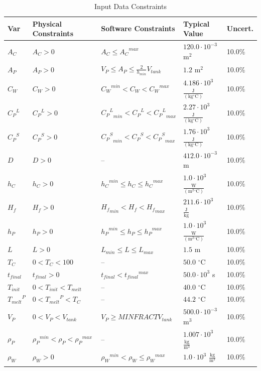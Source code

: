 \documentclass[12pt]{article}
\begin{document}
\begin{longtable}{l l l l l}
\toprule
Var & Physical Constraints & Software Constraints & Typical Value & Uncert.
\\
\midrule
${A_{C}}$ & ${A_{C}}>0$ & ${A_{C}}\leq{}{{A_{C}}^{max}}$ & $120.0\cdot{}10^{-3}$ $\text{m}^{2}$ & 10.0\%
\\
${A_{P}}$ & ${A_{P}}>0$ & ${V_{P}}\leq{}{A_{P}}\leq{}\frac{2}{{h_{min}}} {V_{tank}}$ & $1.2$ $\text{m}^{2}$ & 10.0\%
\\
${C_{W}}$ & ${C_{W}}>0$ & ${{C_{W}}^{min}}<{C_{W}}<{{C_{W}}^{max}}$ & $4.186\cdot{}10^{3}$ $\frac{\text{J}}{(\text{kg}{}^{\circ}\text{C})}$ & 10.0\%
\\
${{C_{P}}^{L}}$ & ${{C_{P}}^{L}}>0$ & ${{{C_{P}}^{L}}_{min}}<{{C_{P}}^{L}}<{{{C_{P}}^{L}}_{max}}$ & $2.27\cdot{}10^{3}$ $\frac{\text{J}}{(\text{kg}{}^{\circ}\text{C})}$ & 10.0\%
\\
${{C_{P}}^{S}}$ & ${{C_{P}}^{S}}>0$ & ${{{C_{P}}^{S}}_{min}}<{{C_{P}}^{S}}<{{{C_{P}}^{S}}_{max}}$ & $1.76\cdot{}10^{3}$ $\frac{\text{J}}{(\text{kg}{}^{\circ}\text{C})}$ & 10.0\%
\\
$D$ & $D>0$ & -- & $412.0\cdot{}10^{-3}$ m & 10.0\%
\\
${h_{C}}$ & ${h_{C}}>0$ & ${{h_{C}}^{min}}\leq{}{h_{C}}\leq{}{{h_{C}}^{max}}$ & $1.0\cdot{}10^{3}$ $\frac{\text{W}}{(\text{m}^{2}{}^{\circ}\text{C})}$ & 10.0\%
\\
${H_{f}}$ & ${H_{f}}>0$ & ${{H_{f}}_{min}}<{H_{f}}<{{H_{f}}_{max}}$ & $211.6\cdot{}10^{3}$ $\frac{\text{J}}{\text{kg}}$ & 10.0\%
\\
${h_{P}}$ & ${h_{P}}>0$ & ${{h_{P}}^{min}}\leq{}{h_{P}}\leq{}{{h_{P}}^{max}}$ & $1.0\cdot{}10^{3}$ $\frac{\text{W}}{(\text{m}^{2}{}^{\circ}\text{C})}$ & 10.0\%
\\
$L$ & $L>0$ & ${L_{min}}\leq{}L\leq{}{L_{max}}$ & $1.5$ m & 10.0\%
\\
${T_{C}}$ & $0<{T_{C}}<100$ & -- & $50.0$ ${}^{\circ}$C & 10.0\%
\\
${t_{final}}$ & ${t_{final}}>0$ & ${t_{final}}<{{t_{final}}^{max}}$ & $50.0\cdot{}10^{3}$ s & 10.0\%
\\
${T_{init}}$ & $0<{T_{init}}<{T_{melt}}$ & -- & $40.0$ ${}^{\circ}$C & 10.0\%
\\
${{T_{melt}}^{P}}$ & $0<{{T_{melt}}^{P}}<{T_{C}}$ & -- & $44.2$ ${}^{\circ}$C & 10.0\%
\\
${V_{P}}$ & $0<{V_{P}}<{V_{tank}}$ & ${V_{P}}\geq{}MINFRACT {V_{tank}}$ & $500.0\cdot{}10^{-3}$ $\text{m}^{3}$ & 10.0\%
\\
${ρ_{P}}$ & ${{ρ_{P}}^{min}}<{ρ_{P}}<{{ρ_{P}}^{max}}$ & -- & $1.007\cdot{}10^{3}$ $\frac{\text{kg}}{\text{m}^{3}}$ & 10.0\%
\\
${ρ_{W}}$ & ${ρ_{W}}>0$ & ${{ρ_{W}}^{min}}<{ρ_{W}}\leq{}{{ρ_{W}}^{max}}$ & $1.0\cdot{}10^{3}$ $\frac{\text{kg}}{\text{m}^{3}}$ & 10.0\%
\\
\bottomrule
\caption{Input Data Constraints}
\label{Table:InDataConstraints}
\end{longtable}
\end{document}
